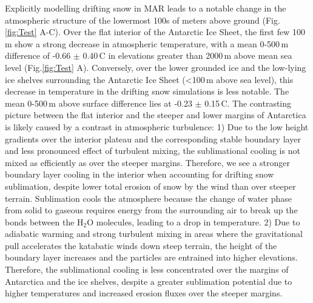 \documentclass[draft]{agujournal2019}
\begin{document}
Explicitly modelling drifting snow in MAR leads to a notable change in the atmospheric structure of the lowermost 100s of meters above ground (Fig.\ref{fig:Test} A-C). Over the flat interior of the Antarctic Ice Sheet, the first few 100\,m show a strong decrease in atmospheric temperature, with a mean 0-500\,m difference of -0.66 $\pm$ 0.40\,\textdegree C in elevations greater than 2000\,m above mean sea level (Fig.\ref{fig:Test} A). Conversely, over the lower grounded ice and the low-lying ice shelves surrounding the Antarctic Ice Sheet (<100\,m above sea level), this decrease in temperature in the drifting snow simulations is less notable. The mean 0-500\,m above surface difference lies at -0.23 $\pm$ 0.15\,\textdegree C. The contrasting picture between the flat interior and the steeper and lower margins of Antarctica is likely caused by a contrast in atmospheric turbulence: 1) Due to the low height gradients over the interior plateau and the corresponding stable boundary layer and less pronounced effect of turbulent mixing, the sublimational cooling is not mixed as efficiently as over the steeper margins. Therefore, we see a stronger boundary layer cooling in the interior when accounting for drifting snow sublimation, despite lower total erosion of snow by the wind than over steeper terrain. Sublimation cools the atmosphere because the change of water phase from solid to gaseous requires energy from the surrounding air to break up the bonds between the H$_2$O molecules, leading to a drop in temperature. 2) Due to adiabatic warming and strong turbulent mixing in areas where the gravitational pull accelerates the katabatic winds down steep terrain, the height of the boundary layer increases and the particles are entrained into higher elevations. Therefore, the sublimational cooling is less concentrated over the margins of Antarctica and the ice shelves, despite a greater sublimation potential due to higher temperatures and increased erosion fluxes over the steeper margins.
\end{document}
